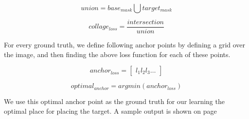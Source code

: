 \documentclass{article}
\begin{document}
\begin{equation}
union = base_{mask} \bigcup target_{mask}
\end{equation}

\begin{equation}
collage_{loss} = \frac{intersection}{union}
\end{equation}

For every ground truth, we define following anchor points by defining a grid over the image, and then finding the above loss function for each of these points. 

\begin{equation}
anchor_{loss} = 
\begin{bmatrix}
l_{1} l_{2} l_{3} \ldots 
\end{bmatrix}
\end{equation}

\begin{equation}
    optimal_{anchor} = argmin(anchor_{loss})
\end{equation}

We use this optimal anchor point as the ground truth for our learning the optimal place for placing the target. A sample output is shown on page \pageref{fig:learned_collage_output}
\end{document}
